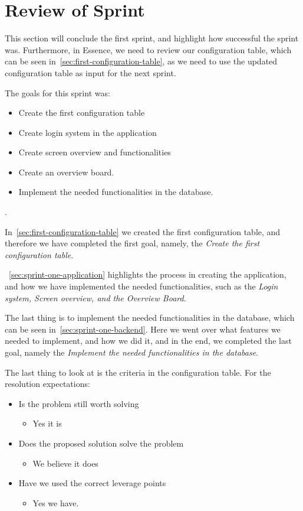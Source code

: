 \section{Review of Sprint}\label{sec:review-sprint-anne}
This section will conclude the first sprint, and highlight how successful the sprint was.
Furthermore, in Essence, we need to review our configuration table, which can be seen in~\autoref{sec:first-configuration-table}, as we need to use the updated configuration table as input for the next sprint.

The goals for this sprint was:

\begin{itemize}
    \item Create the first configuration table 
    \item Create login system in the application
    \item Create screen overview and functionalities
    \item Create an overview board.
    \item Implement the needed functionalities in the database.
\end{itemize}.

In~\autoref{sec:first-configuration-table} we created the first configuration table, and therefore we have completed the first goal, namely, the \textit{Create the first configuration table}.

~\autoref{sec:sprint-one-application} highlights the process in creating the application, and how we have implemented the needed functionalities, such as the \textit{Login system, Screen overview, and the Overview Board}.

The last thing is to implement the needed functionalities in the database, which can be seen in~\autoref{sec:sprint-one-backend}.
Here we went over what features we needed to implement, and how we did it, and in the end, we completed the last goal, namely the \textit{Implement the needed functionalities in the database}.

The last thing to look at is the criteria in the configuration table.
For the resolution expectations:

\begin{itemize}
    \item Is the problem still worth solving
    \begin{itemize}
        \item Yes it is
    \end{itemize}
    \item Does the proposed solution solve the problem
    \begin{itemize}
        \item We believe it does
    \end{itemize}
    \item Have we used the correct leverage points
    \begin{itemize}
        \item Yes we have.
    \end{itemize}
\end{itemize}

